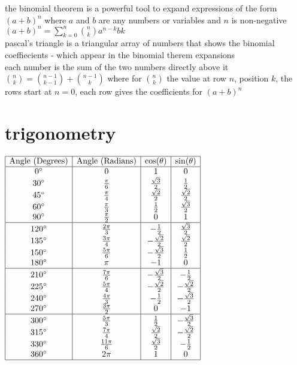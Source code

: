 \documentclass{article}
\begin{document}
the binomial theorem is a powerful tool to expand expressions of the form $(a + b)^n$ where $a$ and $b$ are any numbers or variables and $n$ is non-negative\\
$(a + b)^n = \sum_{k=0}^{n} \binom{n}{k}a^{n-k}b{k}$\\

pascal's triangle is a triangular array of numbers that shows the binomial coeffiecients - which appear in the binomial therem expansions\\

each number is the sum of the two numbers directly above it $\binom{n}{k} = \binom{n-1}{k-1} + \binom{n-1}{k}$ where for $\binom{n}{k}$ the value at row $n$, position $k$, the rows start at $n=0$, each row gives the coefficients for $(a+b)^n$

\newpage
\section*{trigonometry}

$
\begin{array}{|c|c|c|c|}
\hline
\text{Angle (Degrees)} & \text{Angle (Radians)} & \cos(\theta) & \sin(\theta) \\
\hline
0^\circ & 0 & 1 & 0 \\
30^\circ & \frac{\pi}{6} & \frac{\sqrt{3}}{2} & \frac{1}{2} \\
45^\circ & \frac{\pi}{4} & \frac{\sqrt{2}}{2} & \frac{\sqrt{2}}{2} \\
60^\circ & \frac{\pi}{3} & \frac{1}{2} & \frac{\sqrt{3}}{2} \\
90^\circ & \frac{\pi}{2} & 0 & 1 \\
\hline
120^\circ & \frac{2\pi}{3} & -\frac{1}{2} & \frac{\sqrt{3}}{2} \\
135^\circ & \frac{3\pi}{4} & -\frac{\sqrt{2}}{2} & \frac{\sqrt{2}}{2} \\
150^\circ & \frac{5\pi}{6} & -\frac{\sqrt{3}}{2} & \frac{1}{2} \\
180^\circ & \pi & -1 & 0 \\
\hline
210^\circ & \frac{7\pi}{6} & -\frac{\sqrt{3}}{2} & -\frac{1}{2} \\
225^\circ & \frac{5\pi}{4} & -\frac{\sqrt{2}}{2} & -\frac{\sqrt{2}}{2} \\
240^\circ & \frac{4\pi}{3} & -\frac{1}{2} & -\frac{\sqrt{3}}{2} \\
270^\circ & \frac{3\pi}{2} & 0 & -1 \\
\hline
300^\circ & \frac{5\pi}{3} & \frac{1}{2} & -\frac{\sqrt{3}}{2} \\
315^\circ & \frac{7\pi}{4} & \frac{\sqrt{2}}{2} & -\frac{\sqrt{2}}{2} \\
330^\circ & \frac{11\pi}{6} & \frac{\sqrt{3}}{2} & -\frac{1}{2} \\
360^\circ & 2\pi & 1 & 0 \\
\hline
\end{array}
$\\
\end{document}
